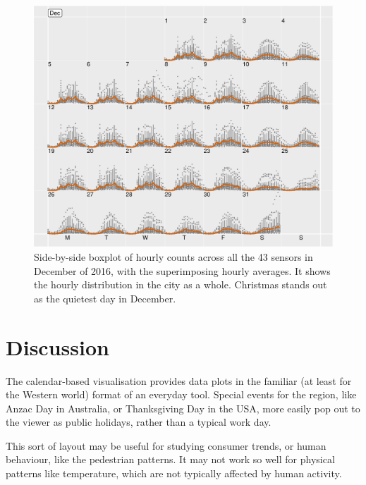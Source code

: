 \documentclass[article]{jss}
\begin{document}
\begin{CodeChunk}
\begin{figure}

{\centering \includegraphics[width=\textwidth]{figure/boxplot-1} 

}

\caption[Side-by-side boxplot of hourly counts across all the 43 sensors in December of 2016, with the superimposing hourly averages]{Side-by-side boxplot of hourly counts across all the 43 sensors in December of 2016, with the superimposing hourly averages. It shows the hourly distribution in the city as a whole. Christmas stands out as the quietest day in December.}\label{fig:boxplot}
\end{figure}
\end{CodeChunk}

\section{Discussion}\label{discussion}

\label{sec:discussion}

The calendar-based visualisation provides data plots in the familiar (at
least for the Western world) format of an everyday tool. Special events
for the region, like Anzac Day in Australia, or Thanksgiving Day in the
USA, more easily pop out to the viewer as public holidays, rather than a
typical work day.

This sort of layout may be useful for studying consumer trends, or human
behaviour, like the pedestrian patterns. It may not work so well for
physical patterns like temperature, which are not typically affected by
human activity.


\end{document}
